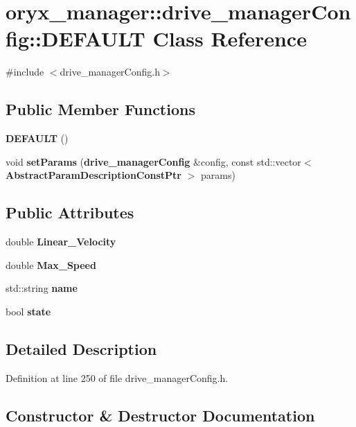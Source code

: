 \section{oryx\-\_\-manager\-:\-:drive\-\_\-manager\-Config\-:\-:\-D\-E\-F\-A\-U\-L\-T \-Class \-Reference}
\label{classoryx__manager_1_1drive__managerConfig_1_1DEFAULT}


{\ttfamily \#include $<$drive\-\_\-manager\-Config.\-h$>$}

\subsection*{\-Public \-Member \-Functions}
\begin{DoxyCompactItemize}
\item 
{\bf \-D\-E\-F\-A\-U\-L\-T} ()
\item 
void {\bf set\-Params} ({\bf drive\-\_\-manager\-Config} \&config, const std\-::vector$<$ {\bf \-Abstract\-Param\-Description\-Const\-Ptr} $>$ params)
\end{DoxyCompactItemize}
\subsection*{\-Public \-Attributes}
\begin{DoxyCompactItemize}
\item 
double {\bf \-Linear\-\_\-\-Velocity}
\item 
double {\bf \-Max\-\_\-\-Speed}
\item 
std\-::string {\bf name}
\item 
bool {\bf state}
\end{DoxyCompactItemize}


\subsection{\-Detailed \-Description}


\-Definition at line 250 of file drive\-\_\-manager\-Config.\-h.



\subsection{\-Constructor \& \-Destructor \-Documentation}
